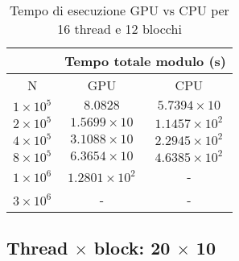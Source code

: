 \begin{table}[ht!]
    \begin{center}
        \renewcommand{\arraystretch}{1.5}
        \begin{adjustbox}{width=.45\textwidth}
            \begin{tabular}{ |c|c|c| }
                \hline
                \multicolumn{1}{|c}{} & \multicolumn{2}{|c|}{Tempo totale modulo (s)} \\
                  \hline
                  N & GPU & CPU \\
                  \hline
                  $1 \times 10^5$ & $8.0828$ & $5.7394 \times 10$ \\
                  \hline 
                  $2 \times 10^5$ & $1.5699 \times 10$ & $1.1457 \times 10^{2}$ \\
                  \hline 
                  $4 \times 10^5$ & $3.1088 \times 10$ & $2.2945 \times 10^{2}$ \\
                  \hline 
                  $8 \times 10^5$ & $6.3654 \times 10$ & $4.6385 \times 10^{2}$ \\
                  \hline 
                  $1 \times 10^6$ & $1.2801 \times 10^{2}$ & - \\
                  \hline
                  $3 \times 10^6$ & - & - \\
                  \hline
            \end{tabular}
        \end{adjustbox}
    \end{center}
    \caption{Tempo di esecuzione GPU vs CPU per 16 thread e 12 blocchi}
    \label{tab:time_table_16x12}
\end{table}


\newpage
\subsection{Thread $\times$ block: 20 $\times$ 10}

